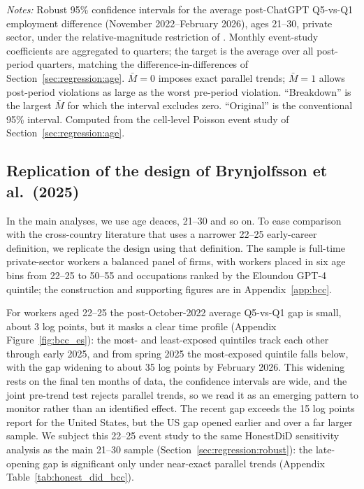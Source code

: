 \documentclass[12pt]{article}
\begin{document}
\begin{table}[tp]
  \centering
  \caption{HonestDiD sensitivity of the Q5-vs-Q1 employment effect to violations of parallel trends, ages 21--30, private sector.}
  \label{tab:honest_did}
  
  \begin{minipage}{\textwidth}\footnotesize\textit{Notes:} Robust 95\% confidence intervals for the average post-ChatGPT Q5-vs-Q1 employment difference (November 2022--February 2026), ages 21--30, private sector, under the relative-magnitude restriction of \citet{rambachan2023}. Monthly event-study coefficients are aggregated to quarters; the target is the average over all post-period quarters, matching the difference-in-differences of Section~\ref{sec:regression:age}. $\bar{M}=0$ imposes exact parallel trends; $\bar{M}=1$ allows post-period violations as large as the worst pre-period violation. ``Breakdown'' is the largest $\bar{M}$ for which the interval excludes zero. ``Original'' is the conventional 95\% interval. Computed from the cell-level Poisson event study of Section~\ref{sec:regression:age}.\end{minipage}
\end{table}



\subsection{Replication of the design of Brynjolfsson et al.\ (2025)}\label{sec:regression:bcc}

In the main analyses, we use age deaces, 21--30 and so on. To ease comparison with the cross-country literature that uses a narrower 22--25 early-career definition, we replicate the \citet{brynjolfsson2025} design using that definition. The sample is full-time private-sector workers a balanced panel of firms, with workers placed in six age bins from 22--25 to 50--55 and occupations ranked by the Eloundou GPT-4 quintile; the construction and supporting figures are in Appendix~\ref{app:bcc}.

For workers aged 22--25 the post-October-2022 average Q5-vs-Q1 gap is small, about 3 log points, but it masks a clear time profile (Appendix Figure~\ref{fig:bcc_es}): the most- and least-exposed quintiles track each other through early 2025, and from spring 2025 the most-exposed quintile falls below, with the gap widening to about 35 log points by February 2026. This widening rests on the final ten months of data, the confidence intervals are wide, and the joint pre-trend test rejects parallel trends, so we read it as an emerging pattern to monitor rather than an identified effect. The recent gap exceeds the 15 log points \citet{brynjolfsson2025} report for the United States, but the US gap opened earlier and over a far larger sample. We subject this 22--25 event study to the same HonestDiD sensitivity analysis as the main 21--30 sample (Section~\ref{sec:regression:robust}): the late-opening gap is significant only under near-exact parallel trends (Appendix Table~\ref{tab:honest_did_bcc}).
\end{document}
